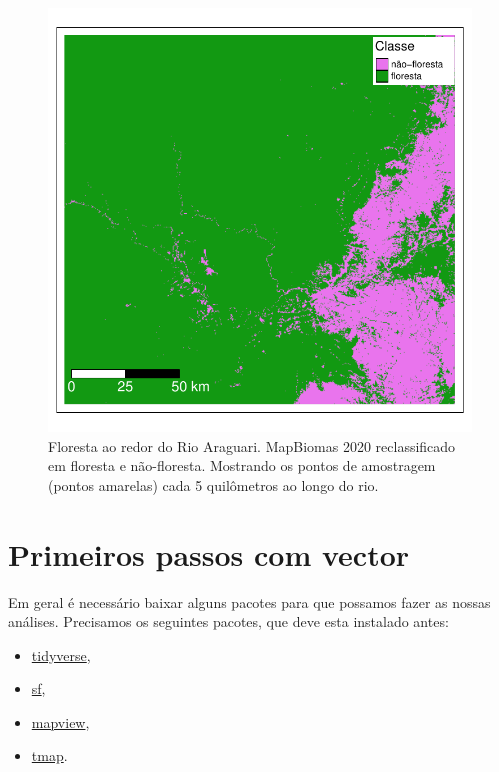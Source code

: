\documentclass[
]{article}
\providecommand{\tightlist}{%
  \setlength{\itemsep}{0pt}\setlength{\parskip}{0pt}}
\begin{document}
\begin{figure}
\centering
\includegraphics{epr_files/figure-latex/unnamed-chunk-251-1.pdf}
\caption{\label{fig:unnamed-chunk-251}Floresta ao redor do Rio Araguari. MapBiomas 2020 reclassificado em floresta e não-floresta. Mostrando os pontos de amostragem (pontos amarelas) cada 5 quilômetros ao longo do rio.}
\end{figure}

\newpage{}

\hypertarget{primeiros-passos-com-vector}{%
\section{Primeiros passos com vector}\label{primeiros-passos-com-vector}}

Em geral é necessário baixar alguns pacotes para que possamos fazer as nossas análises. Precisamos os seguintes pacotes, que deve esta instalado antes:

\begin{itemize}
\tightlist
\item
  \href{https://www.tidyverse.org/}{tidyverse},
\item
  \href{https://r-spatial.github.io/sf/}{sf},
\item
  \href{https://r-spatial.github.io/mapview/}{mapview},
\item
  \href{https://r-tmap.github.io/tmap-book/}{tmap}.
\end{itemize}
\end{document}
